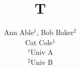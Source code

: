 \documentclass{article}
\begin{document}
\title{T}
\author{Ann Able$^{1}$, Bob Baker$^{2}$ \\ \vspace{2mm}Cat Cole$^{1}$ \\ $^{1}$Univ A \\ $^{2}$Univ B}
\maketitle
\end{document}
